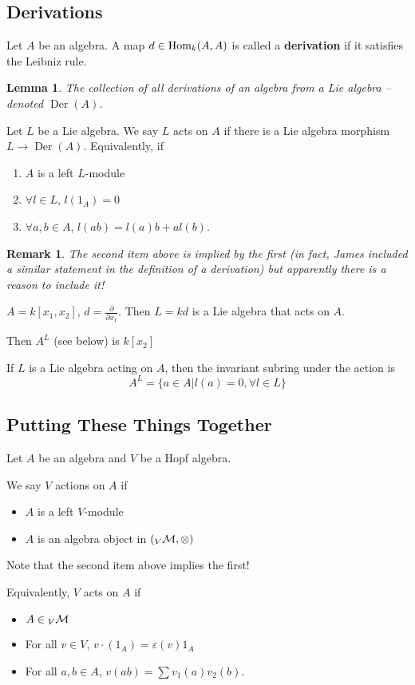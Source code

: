 \documentclass[12pt]{article}
\theoremstyle{break}
\theoremstyle{nonumberbreak}
\theoremstyle{changebreak}
\newtheorem{lem}[thm]{Lemma}
\theoremstyle{break}
\theoremstyle{nonumberbreak}
\theoremstyle{nonumberplain}
\theoremstyle{change}
\newtheorem{rmk}[thm]{Remark}
\newcommand*{\Hom}{\ensuremath\text{Hom}}
\DeclareMathOperator{\Der}{Der}
\begin{document}
\subsection{Derivations}
\begin{defn}
	Let $A$ be an algebra. A map $d\in\Hom_k(A,A)$ is called a \textbf{derivation} if
	it satisfies the Leibniz rule.
\end{defn}
\begin{lem}
	The collection of all derivations of an algebra from a Lie algebra -- denoted $\Der(A)$.
\end{lem}
\begin{defn}
	Let $L$ be a Lie algebra. We say $L$ acts on $A$ if there is a Lie algebra morphism $L\to \Der(A)$.
	Equivalently, if
	\begin{enumerate}
		\item $A$ is a left $L$-module
		\item $\forall l\in L$, $l(1_A)=0$
		\item $\forall a,b\in A$, $l(ab)=l(a)b+al(b)$.
	\end{enumerate}
\end{defn}
\begin{rmk}
	The second item above is implied by the first (in fact, James included a similar statement in 
	the definition of a derivation) but apparently there is a reason to include it!
\end{rmk}
\begin{ex}
	$A=k[x_1,x_2]$, $d=\frac{\partial}{\partial x_1}$. Then $L=kd$ is a Lie algebra that acts on $A$.

	Then $A^L$ (see below) is $k[x_2]$
\end{ex}
\begin{defn}
	If $L$ is a Lie algebra acting on $A$, then the invariant subring under the action is
	\[A^L=\{a\in A|l(a)=0,\forall l\in L\}\]
\end{defn}

\subsection{Putting These Things Together}
Let $A$ be an algebra and $V$ be a Hopf algebra.
\begin{defn}
	We say $V$ actions on $A$ if
	\begin{itemize}
		\item $A$ is a left $V$-module
		\item $A$ is an algebra object in $({_V\cal M},\otimes)$
	\end{itemize}
	Note that the second item above implies the first!

	Equivalently, $V$ acts on $A$ if
	\begin{itemize}
		\item $A\in {_V\cal M}$
		\item For all $v\in V$, $v\cdot(1_A)=\varepsilon(v)1_A$
		\item For all $a,b\in A$, $v(ab)=\sum v_1(a)v_2(b)$.
	\end{itemize}
\end{defn}
\end{document}
